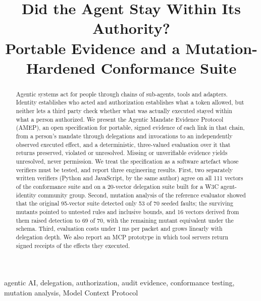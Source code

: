 \documentclass[conference]{IEEEtran}
\newcommand{\pres}{\textsf{preserved}}
\newcommand{\viol}{\textsf{violated}}
\newcommand{\unres}{\textsf{unresolved}}
\begin{document}
\title{Did the Agent Stay Within Its Authority?\\ Portable Evidence and a Mutation-Hardened Conformance Suite}

\author{
}

\maketitle

\begin{abstract}
Agentic systems act for people through chains of sub-agents, tools and adapters. Identity establishes who acted and authorization establishes what a token allowed, but neither lets a third party check whether what was actually executed stayed within what a person authorized. We present the Agentic Mandate Evidence Protocol (AMEP), an open specification for portable, signed evidence of each link in that chain, from a person's mandate through delegations and invocations to an independently observed executed effect, and a deterministic, three-valued evaluation over it that returns \pres{}, \viol{} or \unres{}. Missing or unverifiable evidence yields \unres{}, never permission. We treat the specification as a software artefact whose verifiers must be tested, and report three engineering results. First, two separately written verifiers (Python and JavaScript, by the same author) agree on all 111 vectors of the conformance suite and on a 20-vector delegation suite built for a W3C agent-identity community group. Second, mutation analysis of the reference evaluator showed that the original 95-vector suite detected only 53 of 70 seeded faults; the surviving mutants pointed to untested rules and inclusive bounds, and 16 vectors derived from them raised detection to 69 of 70, with the remaining mutant equivalent under the schema. Third, evaluation costs under 1\,ms per packet and grows linearly with delegation depth. We also report an MCP prototype in which tool servers return signed receipts of the effects they executed.
\end{abstract}

\begin{IEEEkeywords}
agentic AI, delegation, authorization, audit evidence, conformance testing, mutation analysis, Model Context Protocol
\end{IEEEkeywords}
\end{document}
